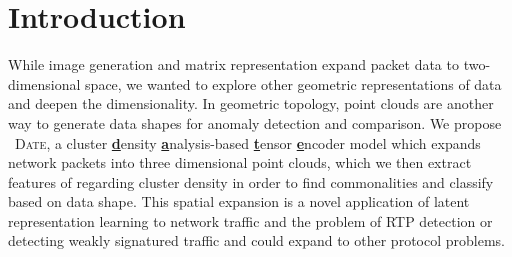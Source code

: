 \section{Introduction}

While image generation and matrix representation expand packet data to two-dimensional space, we wanted to explore other geometric representations of data and deepen the dimensionality. In geometric topology, point clouds are another way to generate data shapes for anomaly detection and comparison. We propose ~\textsc{Date}, a cluster \underline{\textbf{d}}ensity \underline{\textbf{a}}nalysis-based \underline{\textbf{t}}ensor \underline{\textbf{e}}ncoder model which expands network packets into three dimensional point clouds, which we then extract features of regarding cluster density in order to find commonalities and classify based on data shape. This spatial expansion is a novel application of latent representation learning to network traffic and the problem of RTP detection or detecting weakly signatured traffic and could expand to other protocol problems.

